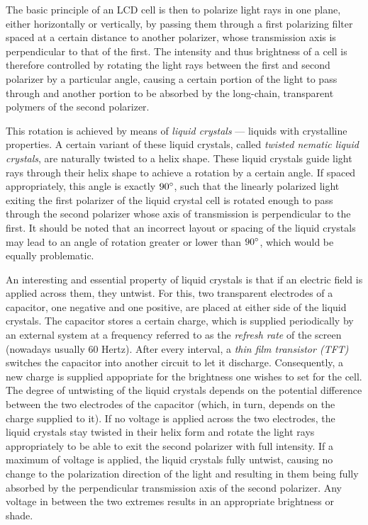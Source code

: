 The basic principle of an LCD cell is then to polarize light rays in one plane, either horizontally or vertically, by passing them through a first polarizing filter spaced at a certain distance to another polarizer, whose transmission axis is perpendicular to that of the first. The intensity and thus brightness of a cell is therefore controlled by rotating the light rays between the first and second polarizer by a particular angle, causing a certain portion of the light to pass through and another portion to be absorbed by the long-chain, transparent polymers of the second polarizer.

This rotation is achieved by means of \emph{liquid crystals} --- liquids with crystalline properties. A certain variant of these liquid crystals, called \emph{twisted nematic liquid crystals}, are naturally twisted to a helix shape. These liquid crystals guide light rays through their helix shape to achieve a rotation by a certain angle. If spaced appropriately, this angle is exactly $90\degree$, such that the linearly polarized light exiting the first polarizer of the liquid crystal cell is rotated enough to pass through the second polarizer whose axis of transmission is perpendicular to the first. It should be noted that an incorrect layout or spacing of the liquid crystals may lead to an angle of rotation greater or lower than $90\degree$, which would be equally problematic.

An interesting and essential property of liquid crystals is that if an electric field is applied across them, they untwist. For this, two transparent electrodes of a capacitor, one negative and one positive, are placed at either side of the liquid crystals. The capacitor stores a certain charge, which is supplied periodically by an external system at a frequency referred to as the \emph{refresh rate} of the screen (nowadays usually 60 Hertz). After every interval, a \emph{thin film transistor (TFT)} switches the capacitor into another circuit to let it discharge. Consequently, a new charge is supplied appopriate for the brightness one wishes to set for the cell. The degree of untwisting of the liquid crystals depends on the potential difference between the two electrodes of the capacitor (which, in turn, depends on the charge supplied to it). If no voltage is applied across the two electrodes, the liquid crystals stay twisted in their helix form and rotate the light rays appropriately to be able to exit the second polarizer with full intensity. If a maximum of voltage is applied, the liquid crystals fully untwist, causing no change to the polarization direction of the light and resulting in them being fully absorbed by the perpendicular transmission axis of the second polarizer. Any voltage in between the two extremes results in an appropriate brightness or shade. 

